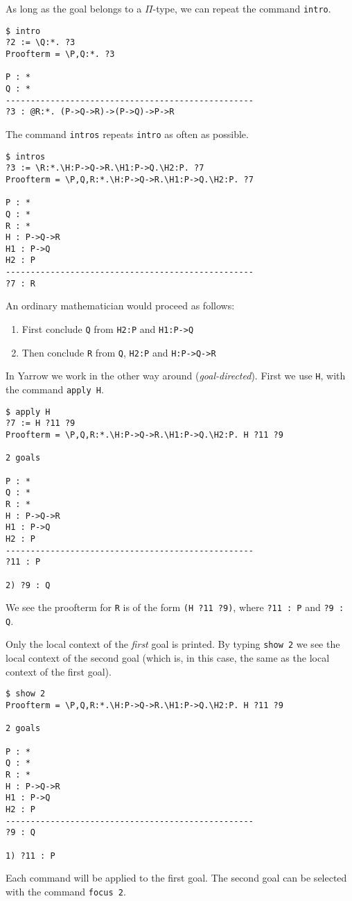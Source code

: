 As long as the goal belongs to a $\Pi$-type,
we can repeat the command {\tt intro}.
\begin{verbatim}
$ intro
?2 := \Q:*. ?3
Proofterm = \P,Q:*. ?3

P : *
Q : *
--------------------------------------------------
?3 : @R:*. (P->Q->R)->(P->Q)->P->R
\end{verbatim}
The command {\tt intros} repeats {\tt intro} as often as possible.
\begin{verbatim}
$ intros
?3 := \R:*.\H:P->Q->R.\H1:P->Q.\H2:P. ?7
Proofterm = \P,Q,R:*.\H:P->Q->R.\H1:P->Q.\H2:P. ?7

P : *
Q : *
R : *
H : P->Q->R
H1 : P->Q
H2 : P
--------------------------------------------------
?7 : R
\end{verbatim}
An ordinary mathematician would proceed as follows:
\begin{enumerate}
\item
First conclude
{\tt Q}
from
{\tt H2:P}
and
{\tt H1:P->Q}
\item
Then conclude
{\tt R}
from
{\tt Q},
{\tt H2:P}
and
{\tt H:P->Q->R}
\end{enumerate}
In Yarrow we work in the other way around ({\em goal-directed}).
First we use {\tt H},
with the command {\tt apply H}.
\begin{verbatim}
$ apply H
?7 := H ?11 ?9
Proofterm = \P,Q,R:*.\H:P->Q->R.\H1:P->Q.\H2:P. H ?11 ?9

2 goals

P : *
Q : *
R : *
H : P->Q->R
H1 : P->Q
H2 : P
--------------------------------------------------
?11 : P

2) ?9 : Q
\end{verbatim}
We see the proofterm for {\tt R} is of the form
{\tt (H ?11 ?9)}, where {\tt ?11 : P} and {\tt ?9 : Q}.

Only the local context of the {\em first} goal is printed.
By typing {\tt show 2} we see the local context of the second goal
(which is, in this case, the same as the local context of the first goal).
\begin{verbatim}
$ show 2
Proofterm = \P,Q,R:*.\H:P->Q->R.\H1:P->Q.\H2:P. H ?11 ?9

2 goals

P : *
Q : *
R : *
H : P->Q->R
H1 : P->Q
H2 : P
--------------------------------------------------
?9 : Q

1) ?11 : P
\end{verbatim}
Each command will be applied to the first goal.
The second goal can be selected with the command {\tt focus 2}.

